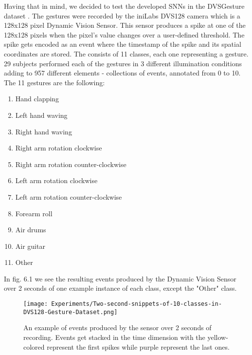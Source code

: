 \documentclass[12pt]{report}
\begin{document}
Having that in mind, we decided to test the developed SNNs in the DVSGesture dataset \cite{Amir2017}. The gestures were recorded by the iniLabs DVS128 camera which is a 128x128 pixel Dynamic Vision Sensor. This sensor produces a spike at one of the 128x128 pixels when the pixel's value changes over a user-defined threshold. The spike gets encoded as an event where the timestamp of the spike and its spatial coordinates are stored. The consists of 11 classes, each one representing a gesture. 29 subjects performed each of the gestures in 3 different illumination conditions adding to 957 different elements - collections of events, annotated from 0 to 10. The 11 gestures are the following:
\begin{enumerate}
    \setcounter{enumi}{0}
    \item Hand clapping
    \item Left hand waving
    \item Right hand waving
    \item Right arm rotation clockwise
    \item Right arm rotation counter-clockwise
    \item Left arm rotation clockwise
    \item Left arm rotation counter-clockwise
    \item Forearm roll
    \item Air drums
    \item Air guitar
    \item Other
\end{enumerate}

\medskip
In fig. 6.1 we see the resulting events produced by the Dynamic Vision Sensor over 2 seconds of one example instance of each class, except the "Other" class.

\begin{figure}[htp] %
    \centering
     \texttt{[image: Experiments/Two-second-snippets-of-10-classes-in-DVS128-Gesture-Dataset.png]}
    \caption{An example of events produced by the sensor over 2 seconds of recording. Events get stacked in the time dimension with the yellow-colored represent the first spikes while purple represent the last ones.}
    \label{fig:representation-methods}
\end{figure}
\end{document}
